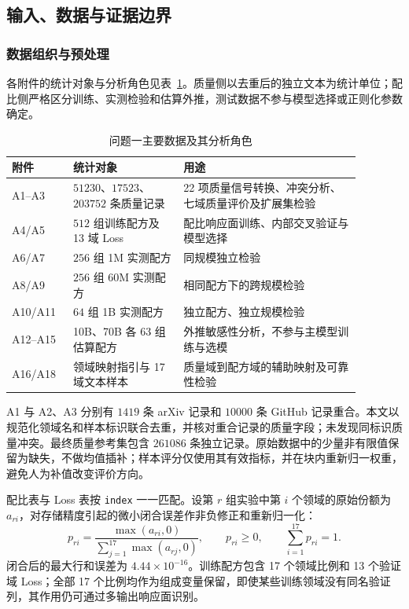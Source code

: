 \subsection{输入、数据与证据边界}

\subsubsection{数据组织与预处理}

各附件的统计对象与分析角色见表~\ref{tab:p1_data_role}。质量侧以去重后的独立文本为统计单位；配比侧严格区分训练、实测检验和估算外推，测试数据不参与模型选择或正则化参数确定。

\begin{table}[htbp]
\centering
\small
\setlength{\tabcolsep}{5pt}
\caption{问题一主要数据及其分析角色}
\label{tab:p1_data_role}
\begin{tabular}{p{0.14\linewidth}p{0.29\linewidth}p{0.45\linewidth}}
\toprule
附件 & 统计对象 & 用途 \\
\midrule
A1--A3 & $51230$、$17523$、$203752$ 条质量记录 & 22 项质量信号转换、冲突分析、七域质量评价及扩展集检验 \\
A4/A5 & $512$ 组训练配方及 13 域 Loss & 配比响应面训练、内部交叉验证与模型选择 \\
A6/A7 & $256$ 组 1M 实测配方 & 同规模独立检验 \\
A8/A9 & $256$ 组 60M 实测配方 & 相同配方下的跨规模检验 \\
A10/A11 & $64$ 组 1B 实测配方 & 独立配方、独立规模检验 \\
A12--A15 & 10B、70B 各 $63$ 组估算配方 & 外推敏感性分析，不参与主模型训练与选模 \\
A16/A18 & 领域映射指引与 17 域文本样本 & 质量域到配方域的辅助映射及可靠性检验 \\
\bottomrule
\end{tabular}
\end{table}

A1 与 A2、A3 分别有 $1419$ 条 arXiv 记录和 $10000$ 条 GitHub 记录重合。本文以规范化领域名和样本标识联合去重，并核对重合记录的质量字段；未发现同标识质量冲突。最终质量参考集包含 $261086$ 条独立记录。原始数据中的少量非有限值保留为缺失，不做均值插补；样本评分仅使用其有效指标，并在块内重新归一权重，避免人为补值改变评价方向。

配比表与 Loss 表按 \texttt{index} 一一匹配。设第 $r$ 组实验中第 $i$ 个领域的原始份额为 $a_{ri}$，对存储精度引起的微小闭合误差作非负修正和重新归一化：
\begin{equation}
p_{ri}=\frac{\max(a_{ri},0)}{\sum_{j=1}^{17}\max(a_{rj},0)},
\qquad p_{ri}\ge 0,
\qquad \sum_{i=1}^{17}p_{ri}=1.
\label{eq:p1_closure}
\end{equation}
闭合后的最大行和误差为 $4.44\times10^{-16}$。训练配方包含 17 个领域比例和 13 个验证域 Loss；全部 17 个比例均作为组成变量保留，即使某些训练领域没有同名验证列，其作用仍可通过多输出响应面识别。

